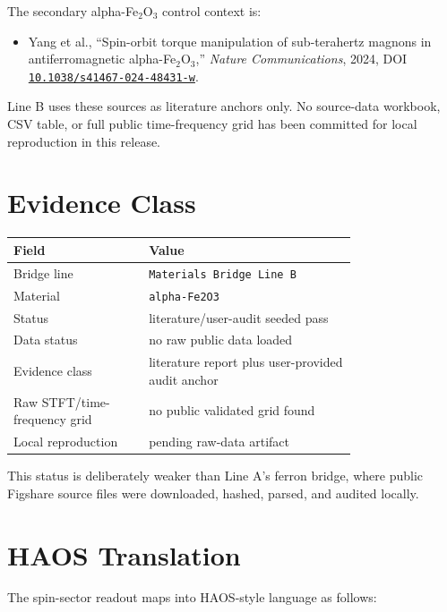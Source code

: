 \documentclass[11pt]{article}
\begin{document}
The secondary alpha-Fe$_2$O$_3$ control context is:

\begin{itemize}
\item Yang et al., ``Spin-orbit torque manipulation of sub-terahertz magnons in antiferromagnetic alpha-Fe$_2$O$_3$,'' \emph{Nature Communications}, 2024, DOI \href{https://doi.org/10.1038/s41467-024-48431-w}{\texttt{10.1038/s41467-024-48431-w}}.
\end{itemize}

Line B uses these sources as literature anchors only. No source-data workbook,
CSV table, or full public time-frequency grid has been committed for local
reproduction in this release.

\section{Evidence Class}

\begin{center}
\begin{tabular}{p{0.30\linewidth}p{0.46\linewidth}}
\toprule
Field & Value \\
\midrule
Bridge line & \texttt{Materials Bridge Line B} \\
Material & \texttt{alpha-Fe2O3} \\
Status & literature/user-audit seeded pass \\
Data status & no raw public data loaded \\
Evidence class & literature report plus user-provided audit anchor \\
Raw STFT/time-frequency grid & no public validated grid found \\
Local reproduction & pending raw-data artifact \\
\bottomrule
\end{tabular}
\end{center}

This status is deliberately weaker than Line A's ferron bridge, where public
Figshare source files were downloaded, hashed, parsed, and audited locally.

\section{HAOS Translation}

The spin-sector readout maps into HAOS-style language as follows:
\end{document}
